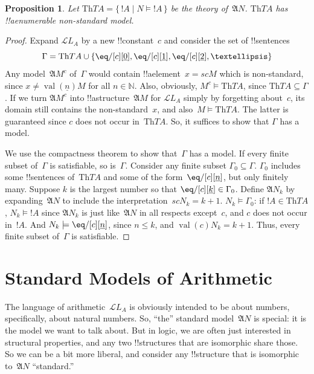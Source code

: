 \documentclass[10pt,a4paper]{article}
\theoremstyle{plain}
\newtheorem{prop}[thm]{Proposition}
\theoremstyle{definition}
\theoremstyle{remark}
\newcommand*{\olfileid}[3]{}
\newcommand*{\olsection}[1]{\section*{#1}}
\providecommand{\Struct}{\ensuremath{\mathfrak{A}}}
\providecommand{\Assign}{\ensuremath{s}}
\providecommand{\Sat}[2]{\ensuremath{#1 \models #2}}
\providecommand{\Lang}{\ensuremath{\mathcal{L}}}
\providecommand{\Th}{\ensuremath{\mathrm{Th}}}
\providecommand{\num}[1]{\underline{#1}}
\providecommand{\Nat}{\ensuremath{\mathbb{N}}}
\providecommand{\Setabs}[2]{\{\, #1 \mid #2 \,\}}
\providecommand{\Value}[1]{\operatorname{val}(#1)}
\begin{document}
\begin{prop}
Let $\Th{TA} = \Setabs{!A}{\Sat{N}{!A}}$ be the theory
of~$\Struct{N}$. $\Th{TA}$ has !!a{enumerable} non-standard model.
\end{prop}

\begin{proof}
Expand $\Lang{L_A}$ by a new !!{constant}~$c$ and consider the set of
!!{sentence}s
\[
\Gamma = \Th{TA} \cup \{\eq/[c][\num{0}], \eq/[c][\num{1}],
\eq/[c][\num{2}], \dots\}
\]
Any model~$\Struct{M^c}$ of~$\Gamma$ would contain !!a{element}~$x =
\Assign{c}{M}$ which is non-standard, since $x \neq
\Value{\num{n}}{M}$ for all $n \in \Nat$. Also, obviously,
$\Sat{M^c}{\Th{TA}}$, since $\Th{TA} \subseteq \Gamma$. If we turn
$\Struct{M^c}$ into !!a{structure}~$\Struct{M}$ for $\Lang{L_A}$
simply by forgetting about~$c$, its domain still contains the
non-standard~$x$, and also~$\Sat{M}{\Th{TA}}$. The latter is
guaranteed since $c$ does not occur in~$\Th{TA}$. So, it suffices to
show that $\Gamma$ has a model.

We use the compactness theorem to show that~$\Gamma$ has a model. If
every finite subset of~$\Gamma$ is satisfiable, so
is~$\Gamma$. Consider any finite subset $\Gamma_0 \subseteq
\Gamma$. $\Gamma_0$ includes some !!{sentence}s of~$\Th{TA}$ and some
of the form~$\eq/[c][\num{n}]$, but only finitely many. Suppose $k$ is
the largest number so that $\eq/[c][\num{k}] \in \Gamma_0$. Define
$\Struct{N_k}$ by expanding~$\Struct{N}$ to include the
interpretation~$\Assign{c}{N_k} = k+1$. $\Sat{N_k}{\Gamma_0}$: if $!A
\in \Th{TA}$, $\Sat{N_k}{!A}$ since $\Struct{N_k}$ is just
like~$\Struct{N}$ in all respects except~$c$, and $c$ does not occur
in~$!A$. And $\Sat{N_k}{\eq/[c][\num{n}]}$, since $n \le k$, and
$\Value{c}{N_k} = k+1$. Thus, every finite subset of~$\Gamma$ is
satisfiable.
\end{proof}





\olfileid{mod}{mar}{stm}
\olsection{Standard Models of Arithmetic}

The language of arithmetic~$\Lang{L_A}$ is obviously intended to be
about numbers, specifically, about natural numbers. So, ``the''
standard model~$\Struct{N}$ is special: it is the model we want to
talk about. But in logic, we are often just interested in structural
properties, and any two !!{structure}s that are isomorphic share
those.  So we can be a bit more liberal, and consider any
!!{structure} that is isomorphic to~$\Struct{N}$ ``standard.''
\end{document}
